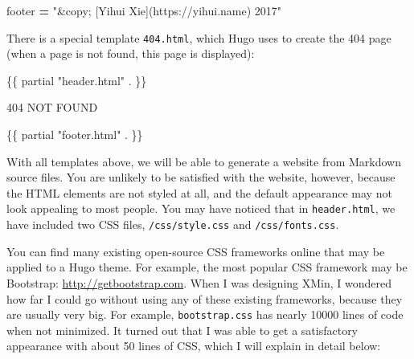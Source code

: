 \documentclass[12pt,]{krantz}
\makeatletter
\newenvironment{Shaded}{\begin{snugshade}}{\end{snugshade}}
\newcommand{\NormalTok}[1]{#1}
\newcommand{\OperatorTok}[1]{\textcolor[rgb]{0.81,0.36,0.00}{\textbf{#1}}}
\newcommand{\StringTok}[1]{\textcolor[rgb]{0.31,0.60,0.02}{#1}}
\newenvironment{kframe}{%
\medskip{}
\setlength{\fboxsep}{.8em}
 \def\at@end@of@kframe{}%
 \ifinner\ifhmode%
  \def\at@end@of@kframe{\end{minipage}}%
  \begin{minipage}{\columnwidth}%
 \fi\fi%
 \def\FrameCommand##1{\hskip\@totalleftmargin \hskip-\fboxsep
 \colorbox{shadecolor}{##1}\hskip-\fboxsep
     \hskip-\linewidth \hskip-\@totalleftmargin \hskip\columnwidth}%
 \MakeFramed {\advance\hsize-\width
   \@totalleftmargin\z@ \linewidth\hsize
   \@setminipage}}%
 {\par\unskip\endMakeFramed%
 \at@end@of@kframe}
\renewenvironment{Shaded}{\begin{kframe}}{\end{kframe}}
\theoremstyle{definition}
\theoremstyle{definition}
\theoremstyle{definition}
\theoremstyle{remark}
\makeatother
\begin{document}
\begin{itemize}
\begin{itemize}
\begin{Shaded}
\begin{Highlighting}[]
\NormalTok{[params]}
\NormalTok{    footer }\OperatorTok{=} \StringTok{"&copy; [Yihui Xie](https://yihui.name) 2017"}
\end{Highlighting}
\end{Shaded}
  \end{itemize}
\end{itemize}

There is a special template \texttt{404.html}, which Hugo uses to create
the 404 page (when a page is not found, this page is
displayed):

\begin{Shaded}
\begin{Highlighting}[]
\NormalTok{\{\{ partial "header.html" . \}\}}

\NormalTok{404 NOT FOUND}

\NormalTok{\{\{ partial "footer.html" . \}\}}
\end{Highlighting}
\end{Shaded}

With all templates above, we will be able to generate a website from
Markdown source files. You are unlikely to be satisfied with the
website, however, because the HTML elements are not styled at all, and
the default appearance may not look appealing to most people. You may
have noticed that in \texttt{header.html}, we have included two CSS
files, \texttt{/css/style.css} and \texttt{/css/fonts.css}.

You can find many existing open-source CSS frameworks online that may be
applied to a Hugo theme. For example, the most popular CSS framework may
be Bootstrap: \url{http://getbootstrap.com}. When I was designing XMin,
I wondered how far I could go without using any of these existing
frameworks, because they are usually very big. For example,
\texttt{bootstrap.css} has nearly 10000 lines of code when not
minimized. It turned out that I was able to get a satisfactory
appearance with about 50 lines of CSS, which I will explain in detail
below:
\end{document}
